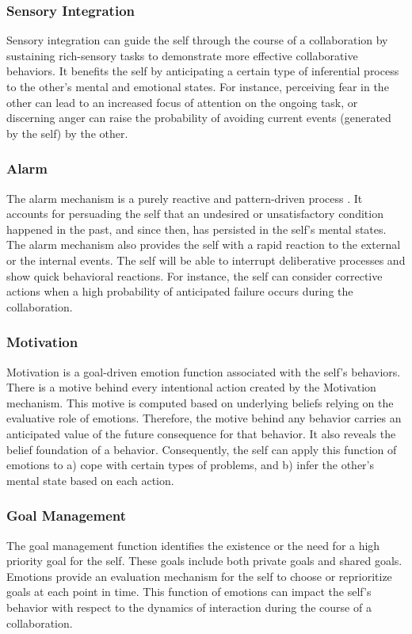 \documentclass[12pt]{report}
\begin{document}
\subsubsection{Sensory Integration} Sensory integration can guide the self
through the course of a collaboration by sustaining rich-sensory tasks to
demonstrate more effective collaborative behaviors. It benefits the self by
anticipating a certain type of inferential process to the other's mental and
emotional states. For instance, perceiving fear in the other can lead to an
increased focus of attention on the ongoing task, or discerning anger can raise
the probability of avoiding current events (generated by the self) by the other.

\subsubsection{Alarm} \label{sub:emotion-alarm} The alarm mechanism is a
purely reactive and pattern-driven process \cite{sloman:beyond-shallow}. It
accounts for persuading the self that an undesired or unsatisfactory condition
happened in the past, and since then, has persisted in the self's mental
states. The alarm mechanism also provides the self with a rapid reaction to the
external or the internal events. The self will be able to interrupt deliberative
processes and show quick behavioral reactions. For instance, the self can
consider corrective actions when a high probability of anticipated failure
occurs during the collaboration.

\subsubsection{Motivation} Motivation is a goal-driven emotion function
associated with the self's behaviors. There is a motive behind every intentional action
created by the Motivation mechanism. This motive is computed based on underlying
beliefs relying on the evaluative role of emotions. Therefore, the motive behind
any behavior carries an anticipated value of the future consequence for that
behavior. It also reveals the belief foundation of a behavior. Consequently, the
self can apply this function of emotions to a) cope with certain types of
problems, and b) infer the other's mental state based on each action.

\subsubsection{Goal Management} The goal management function identifies the
existence or the need for a high priority goal for the self. These goals
include both private goals and shared goals. Emotions provide an evaluation
mechanism for the self to choose or reprioritize goals at each point in time.
This function of emotions can impact the self's behavior with respect to the
dynamics of interaction during the course of a collaboration.
\end{document}

